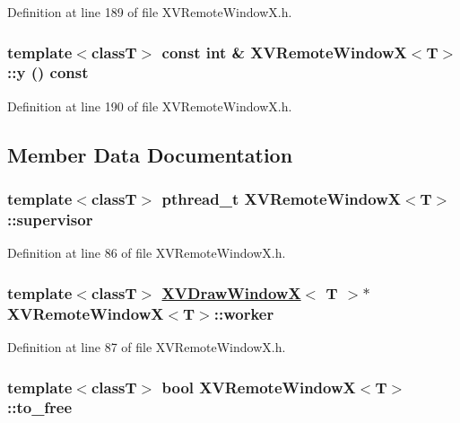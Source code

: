 Definition at line 189 of file XVRemote\-Window\-X.h.\label{XVRemoteWindowX_a39}
\hypertarget{class_XVRemoteWindowX_a39}{
\subsubsection[y]{\setlength{\rightskip}{0pt plus 5cm}template$<$classT$>$ const int \& XVRemote\-Window\-X$<$T$>$::y () const}}




Definition at line 190 of file XVRemote\-Window\-X.h.

\subsection{Member Data Documentation}
\label{XVRemoteWindowX_n2}
\hypertarget{class_XVRemoteWindowX_n2}{
\subsubsection[supervisor]{\setlength{\rightskip}{0pt plus 5cm}template$<$classT$>$ pthread\_\-t XVRemote\-Window\-X$<$T$>$::supervisor}}




Definition at line 86 of file XVRemote\-Window\-X.h.\label{XVRemoteWindowX_n3}
\hypertarget{class_XVRemoteWindowX_n3}{
\subsubsection[worker]{\setlength{\rightskip}{0pt plus 5cm}template$<$classT$>$ \hyperlink{class_XVDrawWindowX}{XVDraw\-Window\-X}$<$ T $>$$\ast$ XVRemote\-Window\-X$<$T$>$::worker}}




Definition at line 87 of file XVRemote\-Window\-X.h.\label{XVRemoteWindowX_n4}
\hypertarget{class_XVRemoteWindowX_n4}{
\subsubsection[to_free]{\setlength{\rightskip}{0pt plus 5cm}template$<$classT$>$ bool XVRemote\-Window\-X$<$T$>$::to\_\-free}}




